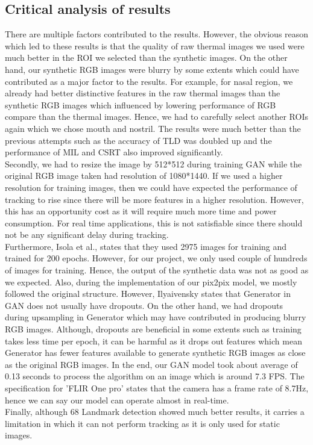 \documentclass[conference]{IEEEtran}
\begin{document}
\subsection{Critical analysis of results}
There are multiple factors contributed to the results. However, the obvious reason which led to these results is that the quality of raw thermal images we used were much better in the ROI we selected than the synthetic images. On the other hand, our synthetic RGB images were blurry by some extents which could have contributed as a major factor to the results. For example, for nasal region, we already had better distinctive features in the raw thermal images than the synthetic RGB images which influenced by lowering performance of RGB compare than the thermal images. Hence, we had to carefully select another ROIs again which we chose mouth and nostril. The results were much better than the previous attempts such as the accuracy of TLD was doubled up and the performance of MIL and CSRT also improved significantly.\\
Secondly, we had to resize the image by 512*512 during training GAN while the original RGB image taken had resolution of 1080*1440. If we used a higher resolution for training images, then we could have expected the performance of tracking to rise since there will be more features in a higher resolution. However, this has an opportunity cost as it will require much more time and power consumption. For real time applications, this is not satisfiable since there should not be any significant delay during tracking.\\
Furthermore, Isola et al.,\cite{b1} states that they used 2975 images for training and trained for 200 epochs. However, for our project, we only used couple of hundreds of images for training. Hence, the output of the synthetic data was not as good as we expected. 
Also, during the implementation of our pix2pix model, we mostly followed the original structure. However, Ilyaivensky \cite{b13} states that Generator in GAN does not usually have dropouts. On the other hand, we had dropouts during upsampling in Generator which may have contributed in producing blurry RGB images. Although, dropouts are beneficial in some extents such as training takes less time per epoch, it can be harmful as it drops out features which mean Generator has fewer features available to generate synthetic RGB images as close as the original RGB images. In the end, our GAN model took about average of 0.13 seconds to process the algorithm on an image which is around 7.3 FPS. The specification for 'FLIR One pro' states that the camera has a frame rate of 8.7Hz\cite{b18}, hence we can say our model can operate almost in real-time. \\
Finally, although 68 Landmark detection showed much better results, it carries a limitation in which it can not perform tracking as it is only used for static images. 
\end{document}
